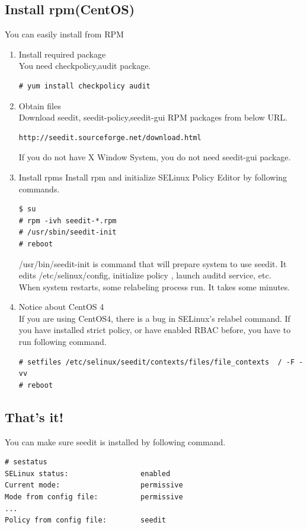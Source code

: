\documentclass{article}
\begin{document}
\subsection{Install rpm(CentOS)}
You can easily install from RPM
\begin{enumerate}
 \item Install required package\\
       You need checkpolicy,audit package.
\begin{verbatim}
# yum install checkpolicy audit
\end{verbatim}
    \item Obtain files\\
Download seedit, seedit-policy,seedit-gui RPM packages from below URL.
\begin{verbatim}
http://seedit.sourceforge.net/download.html
\end{verbatim}
If you do not have X Window System, you do not need seedit-gui package.

 \item Install rpms
Install rpm and initialize SELinux Policy Editor by following commands.
\begin{verbatim}
$ su 
# rpm -ivh seedit-*.rpm
# /usr/sbin/seedit-init
# reboot
\end{verbatim}
 /usr/bin/seedit-init is command that will prepare system to use seedit. It edits /etc/selinux/config, initialize policy , launch auditd service, etc.\\
When system restarts, some relabeling process run. It takes some
	  minutes. \\
\item Notice about CentOS 4\\ 
If you are using CentOS4, there is a bug in SELinux's relabel command.
If you have installed strict policy, or have enabled RBAC before, 
you have to run following command.
\begin{verbatim}
# setfiles /etc/selinux/seedit/contexts/files/file_contexts  / -F -vv
# reboot
\end{verbatim}
\end{enumerate}
\subsection{That's it!}
You can make sure seedit is installed by following command.
\begin{verbatim}
# sestatus
SELinux status:                 enabled
Current mode:                   permissive
Mode from config file:          permissive
...
Policy from config file:        seedit
\end{verbatim}
\end{document}
